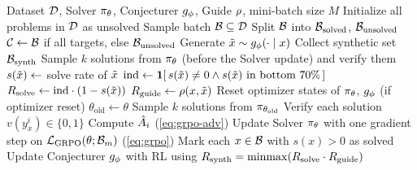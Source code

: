 \begin{algorithm}[tb]
  \caption{SGS-GRPO (on-policy Solver update)}
  \label{alg:sgs-grpo-onpolicy}
  \begin{algorithmic}[1]
     Dataset $\mathcal{D}$, Solver $\pi_\theta$, Conjecturer $g_\phi$, Guide $\rho$, mini-batch size $M$
    \STATE Initialize all problems in $\mathcal{D}$ as unsolved
      \STATE Sample batch $\mathcal{B} \subseteq \mathcal{D}$
      \STATE Split $\mathcal{B}$ into $\mathcal{B}_{\mathrm{solved}}$, $\mathcal{B}_{\mathrm{unsolved}}$
      \STATE $\mathcal{C} \leftarrow \mathcal{B}$ if all targets, else $\mathcal{B}_{\mathrm{unsolved}}$
        \STATE Generate $\tilde{x} \sim g_\phi(\cdot \mid x)$
      \ENDFOR
      \STATE Collect synthetic set $\mathcal{B}_{\mathrm{synth}}$
        \STATE Sample $k$ solutions from $\pi_\theta$ (before the Solver update) and verify them
        \STATE $s(\tilde{x}) \leftarrow$ solve rate of $\tilde{x}$
        \STATE $\text{ind} \leftarrow \mathbf{1}[\, s(\tilde{x}) \neq 0 \land s(\tilde{x}) \text{ in bottom } 70\% \,]$
        \STATE $R_{\text{solve}} \leftarrow \text{ind} \cdot (1 - s(\tilde{x}))$
        \STATE $R_{\text{guide}} \leftarrow \rho(x, \tilde{x})$
      \ENDFOR
      \STATE Reset optimizer states of $\pi_\theta$, $g_\phi$ (if optimizer reset)
        \STATE $\theta_{\mathrm{old}} \leftarrow \theta$
          \STATE Sample $k$ solutions from $\pi_{\theta_{\mathrm{old}}}$
          \STATE Verify each solution $v(y_x^i) \in \{0,1\}$
          \STATE Compute $\hat{A}_i$ (\cref{eq:grpo-adv})
        \ENDFOR
        \STATE Update Solver $\pi_\theta$ with one gradient step on $\mathcal{L}_{\mathrm{GRPO}}(\theta; \mathcal{B}_m)$ (\cref{eq:grpo})
      \ENDFOR
      \STATE Mark each $x \in \mathcal{B}$ with $s(x) > 0$ as solved
      \STATE Update Conjecturer $g_\phi$ with RL using $R_{\text{synth}} = \operatorname{minmax}(R_{\text{solve}} \cdot R_{\text{guide}})$
    \ENDFOR
  \end{algorithmic}
\end{algorithm}
